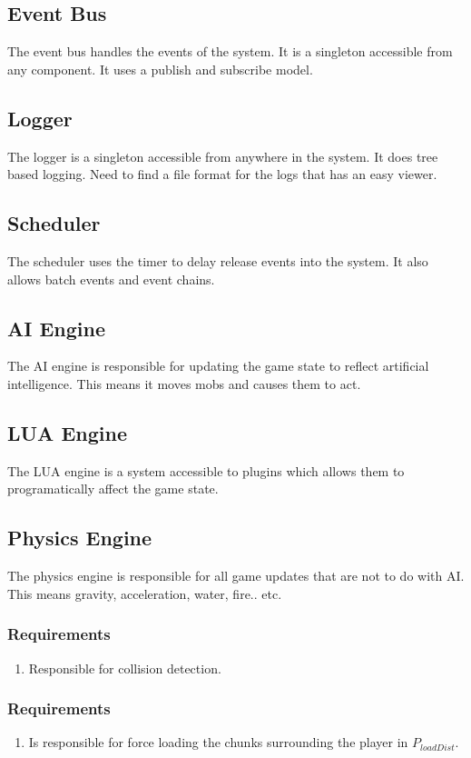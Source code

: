 \documentclass{article}
\newcommand{\playerLoadDistance}{$P_{loadDist}$}
\begin{document}
\subsection{Event Bus}
The event bus handles the events of the system. It is a singleton accessible from any component.  It uses a publish and subscribe model.
\subsection{Logger}
The logger is a singleton accessible from anywhere in the system. It does tree based logging.  Need to find a file format for the logs that has an easy viewer.
\subsection{Scheduler}
The scheduler uses the timer to delay release events into the system.  It also allows batch events and event chains.
\subsection{AI Engine}
The AI engine is responsible for updating the game state to reflect artificial intelligence.  This means it moves mobs and causes them to act.
\subsection{LUA Engine}
The LUA engine is a system accessible to plugins which allows them to programatically affect the game state. 

\subsection{Physics Engine}
The physics engine is responsible for all game updates that are not to do with AI.  This means gravity, acceleration, water, fire.. etc.
\subsubsection{Requirements}
\begin{enumerate}
\item
Responsible for collision detection.
\end{enumerate}

\subsubsection{Requirements}
\begin{enumerate}
\item
Is responsible for force loading the chunks surrounding the player in \playerLoadDistance .
\end{enumerate}
\end{document}
